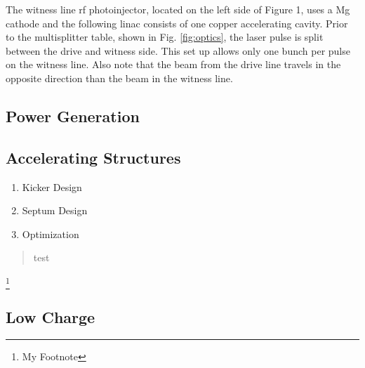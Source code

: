 \documentclass{iitthesis}
\begin{document}
The witness line rf photoinjector, located on the left side of Figure
1, uses a Mg cathode and the following linac consists of one copper
accelerating cavity. Prior to the multisplitter table, shown in
Fig. \ref{fig:optics}, the laser pulse is split between the drive and witness side.
This set up allows only one bunch per pulse on the witness line. Also
note that the beam from the drive line travels in the opposite direction
than the beam in the witness line. 


\subsection{Power Generation}

\subsection{Accelerating Structures}


\begin{enumerate}
	\item Kicker Design
	\item Septum Design
	\item Optimization 
\end{enumerate}

\begin{quotation}
	test
\end{quotation}

\clearpage





\footnote{My Footnote} 





\subsection{Low Charge}
\end{document}
